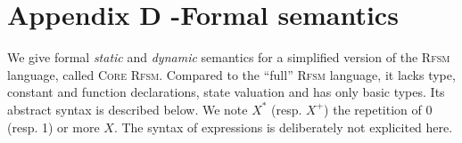 \chapter*{Appendix D -Formal semantics}
\label{cha:semantics}

\newcommand{\truev}{\mathsf{T}}
\newcommand{\tuple}[1]{\langle#1\rangle}
\newcommand{\ttuple}[2]{\langle#1, #2\rangle}
\newcommand{\tttuple}[3]{\langle#1, #2, #3\rangle}
\newcommand{\ttttuple}[4]{\langle#1, #2, #3, #4\rangle}
\newcommand{\tttttuple}[5]{\langle#1, #2, #3, #4, #5\rangle}
\newcommand{\ttttttuple}[6]{\langle#1, #2, #3, #4, #5, #6\rangle}
\newcommand{\tttttttuple}[7]{\langle#1, #2, #3, #4, #5, #6\rangle}
\newcommand{\ttttttttuple}[8]{\langle#1, #2, #3, #4, #5, #6\rangle}
\newcommand{\tuplen}[1]{\langle#1_1,\ldots,#1_n\rangle}
\newcommand{\tuplez}{\langle\rangle}
\newcommand{\cupp}[3]{\displaystyle{\bigcup_{#1}^{#2}}~#3}
\newcommand{\capp}[3]{\displaystyle{\bigcap_{#1}^{#2}}~#3}
\newcommand{\oplusn}[3]{\displaystyle{\bigoplus_{#1}^{#2}}~#3}
\newcommand{\valred}[2]{\rho_{#2}(#1)}
\newcommand{\emptyseq}{\langle\rangle}
\newcommand{\sequ}[1]{\langle#1\rangle}
\newcommand{\ssequ}[2]{\langle#1; #2\rangle}
\newcommand{\sssequ}[3]{\langle#1; #2; #3\rangle}
\newcommand{\sequn}[1]{\langle#1_1;\ldots;#1_n\rangle}
\newcommand{\sequm}[2]{\langle#1_1;\ldots;#1_#2\rangle}
\newcommand{\squn}[1]{#1_1,\ldots,#1_n}

\newcommand{\delt}[4]{\ttttuple{#1}{#2}{#3}{#4}}
\newcommand{\trans}[3]{#1 \xrightarrow{#2} #3}
\newcommand{\transs}[4]{#1 \xrightarrow[#3]{#2} #4}
\newcommand\doubleplus{+\kern-1.3ex+\kern0.8ex}

\newcommand{\larrow}{\xrightarrow}
\newcommand{\seqn}[3]{#3_#1,\ldots,#3_#2}
\newcommand{\cuppn}[1]{\cupp{i=1}{n}{#1}}
\newcommand{\setn}[1]{\{#1_1,\ldots,#1_n\}}
\newcommand{\mm}{\mathcal{M}}
\newcommand{\ssigma}{\overline{\sigma}}
\newcommand{\ssigm}{\overline{s}}
\newcommand{\eval}[2]{\mathcal{E}_{#1}\llbracket #2 \rrbracket}
\newcommand{\falln}[3]{\forall #1\in\{#2,\ldots,#3\}\quad}
\newcommand{\semfn}[3]{\mathcal{#1}_{#2}\llbracket #3 \rrbracket}
\newcommand{\vars}{\mathcal{V}}
\newcommand{\env}{\Gamma}
\newcommand{\expr}{\mathsf{e}}
\newcommand{\cupdot}{\mathbin{\mathaccent\cdot\cup}}

\vspace{-5mm}
We give formal \emph{static} and \emph{dynamic} semantics for a simplified version of the
\textsc{Rfsm} language, called \textsc{Core Rfsm}. Compared to the ``full'' \textsc{Rfsm} language,
it lacks type, constant and function declarations, state valuation and has only basic types. 
Its abstract syntax is described below. We note $X^*$ (resp. $X^+$) the repetition of 0
(resp. 1) or more $X$. The syntax of expressions is deliberately not explicited here. 

